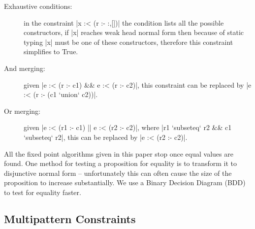 \documentclass[preprint]{sigplanconf}
\begin{document}
\begin{description}
\item[Exhaustive conditions:] in the constraint |x :< (r :- {:,[]})| the condition lists all the possible constructors, if |x| reaches weak head normal form then because of static typing |x| must be one of these constructors, therefore this constraint simplifies to True.

\item[And merging:] given |e :< (r :- c1) && e :< (r :- c2)|, this constraint can be replaced by |e :< (r :- (c1 `union` c2))|.

\item[Or merging:] given |e :< (r1 :- c1) || e :< (r2 :- c2)|, where |r1 `subseteq` r2 && c1 `subseteq` r2|, this can be replaced by |e :< (r2 :- c2)|.
\end{description}

All the fixed point algorithms given in this paper stop once equal values are found. One method for testing a proposition for equality is to transform it to disjunctive normal form -- unfortunately this can often cause the size of the proposition to increase substantially. We use a Binary Decision Diagram (BDD) \citep{lee:bdd} to test for equality faster.

\subsection{Multipattern Constraints}
\label{sec:multipattern}
\end{document}
